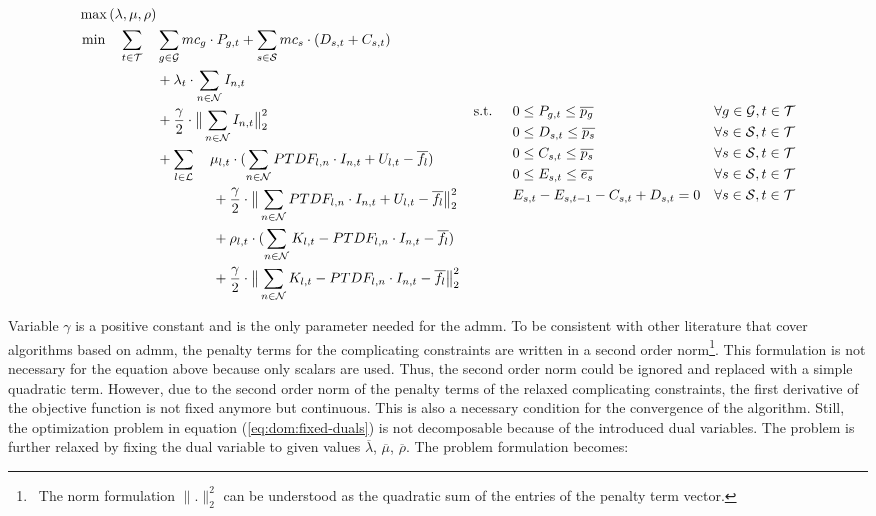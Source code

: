 \begin{subequations}
	\begin{align}
		\max{(\lambda, \mu, \rho)} \label{eq:dom:fixed-duals} \\
		\min \quad \sum_{t\in\mathcal{T}} \quad & \sum_{g\in\mathcal{G}}mc_g \cdot P_{g,t} + \sum_{s\in\mathcal{S}}mc_s \cdot (D_{s,t}+C_{s,t}) \nonumber \\
		 & + \lambda_t \cdot \sum_{n \in \mathcal{N}} I_{n,t} \nonumber \\
		 & + \frac{\gamma}{2} \cdot \big\|\sum_{n \in \mathcal{N}} I_{n,t}\big\|^2_2 \nonumber \\
		 & +  \sum_{l \in \mathcal{L}} \quad \mu_{l,t} \cdot (\sum_{n \in \mathcal{N}} PTDF_{l,n} \cdot I_{n,t} + U_{l,t} - \overline{f_l}) \nonumber \\
		 & \qquad \qquad + \frac{\gamma}{2} \cdot \big\| \sum_{n \in \mathcal{N}} PTDF_{l,n} \cdot I_{n,t} + U_{l,t} - \overline{f_l} \big\|^2_2 \nonumber \\
		 & \qquad \qquad + \rho_{l,t} \cdot (\sum_{n \in \mathcal{N}} K_{l,t} - PTDF_{l,n} \cdot I_{n,t} - \overline{f_l}) \nonumber \\
		 & \qquad \qquad + \frac{\gamma}{2} \cdot \big\|\sum_{n \in \mathcal{N}} K_{l,t} - PTDF_{l,n} \cdot I_{n,t} - \overline{f_l} \big\|^2_2 \nonumber
	\end{align}
	\begin{align}
		 \text{s.t. } \quad & 0 \leq P_{g,t} \leq \overline{p_g} && \forall g \in \set{G}, t \in \set{T}\\
		 & 0 \leq D_{s,t} \leq \overline{p_s} && \forall s \in \set{S}, t \in \set{T} \\
		 & 0 \leq C_{s,t} \leq \overline{p_s} && \forall s \in \set{S}, t \in \set{T} \\
		 & 0 \leq E_{s,t} \leq \overline{e_s} && \forall s \in \set{S}, t \in \set{T} \\
		 & E_{s,t} - E_{s,t-1} - C_{s,t} + D_{s,t} = 0 && \forall s \in \set{S}, t \in \set{T}
	\end{align}
\end{subequations}

Variable $\gamma$ is a positive constant and is the only parameter needed for the \gls{admm}. To be consistent with other literature that cover algorithms based on \gls{admm}, the penalty terms for the complicating constraints are written in a second order norm\footnote{~The norm formulation $\big\| . \big\|^2_2$ can be understood as the quadratic sum of the entries of the penalty term vector.}. This formulation is not necessary for the equation above because only scalars are used. Thus, the second order norm could be ignored and replaced with a simple quadratic term. However, due to the second order norm of the penalty terms of the relaxed complicating constraints, the first derivative of the objective function is not fixed anymore but continuous. This is also a necessary condition for the convergence of the algorithm. Still, the optimization problem in equation (\ref{eq:dom:fixed-duals}) is not decomposable because of the introduced dual variables. The problem is further relaxed by fixing the dual variable to given values $\overline{\lambda}$, $\overline{\mu}$, $\overline{\rho}$. The problem formulation becomes:

